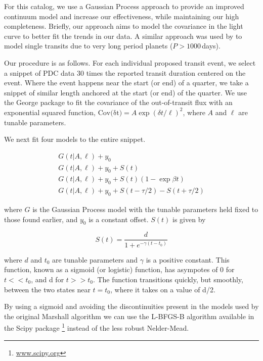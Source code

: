 For this catalog, we use a Gaussian Process approach \citep[GP,][]{Rasmussen10} to provide an improved continuum model and increase our effectiveness, while maintaining our high completeness. Briefly, our approach aims to model the covariance in the light curve to better fit the trends in our data.
A similar approach was used by \citet{ForemanMackey16} to model single transits due to very long period planets ($P > 1000$\,days).

Our procedure is as follows. For each individual proposed transit event, we select a snippet of PDC data 30 times the reported transit duration centered on the event. Where the event happens near the start (or end) of a quarter, we take a snippet of similar length anchored at the start (or end) of the quarter. We use the George package \citep{Ambikasaran14} to fit the covariance of the out-of-transit flux with an exponential squared function, $ {\mathrm{Cov(\delta t})} = A \exp{ (\delta t/\ell)^2}$, where $A$ and $\ell$ are tunable parameters. 

We next fit four models to the entire snippet.

\begin{equation}
\left.\begin{aligned}
G(t | A, \ell) + y_0 \\
G(t | A, \ell) + y_0 + S(t)\\
G(t | A, \ell) + y_0 + S(t)(1 - \exp{\beta t})\\
G(t | A, \ell) + y_0 + S(t - \tau/2) - S(t + \tau/2) 
\end{aligned}\right.
\label{e:marshall}
\end{equation}

\noindent
where $G$ is the Gaussian Process model with the tunable parameters held fixed to those found earlier, and $y_0$ is a constant offset. $S(t)$ is given by

\begin{equation}
S(t) = \frac{d}{1 + e^{-\gamma (t-t_0)} }
\end{equation}

\noindent
where $d$ and $t_0$ are tunable parameters and $\gamma$ is a positive constant. This function, known as a sigmoid (or logistic) function, has asympotes of 0 for $t<<t_0$, and d for $t>>t_0$. The function transitions quickly, but smoothly, between the two states near $t=t_0$, where it takes on a value of d/2. 

By using a sigmoid and avoiding the discontinuities present in the models used by the original Marshall algorithm \citep{Mullally2016} we can use the L-BFGS-B algorithm \citep{Byrd95} available in the Scipy package \footnote{\url{www.scipy.org}} instead of the less robust Nelder-Mead.

